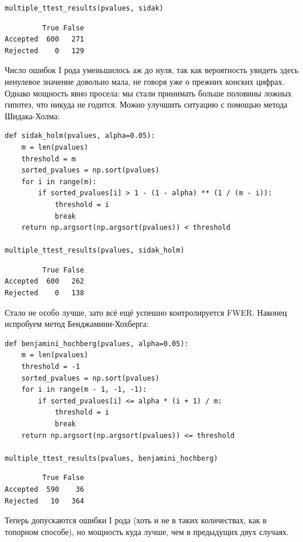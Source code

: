 \begin{example}
\begin{verbatim}
multiple_ttest_results(pvalues, sidak)
    \end{verbatim}
    \begin{lstlisting}
         True False
Accepted  600   271
Rejected    0   129
    \end{lstlisting}
    Число ошибок I рода уменьшилось аж до нуля, так как вероятность увидеть здесь ненулевое значение довольно мала, не говоря уже о прежних конских цифрах. Однако мощность явно просела: мы стали принимать больше половины ложных гипотез, что никуда не годится. Можно улучшить ситуацию с помощью метода Шидака-Холма:
    \begin{verbatim}
def sidak_holm(pvalues, alpha=0.05):
    m = len(pvalues)
    threshold = m
    sorted_pvalues = np.sort(pvalues)
    for i in range(m):
        if sorted_pvalues[i] > 1 - (1 - alpha) ** (1 / (m - i)):
            threshold = i
            break
    return np.argsort(np.argsort(pvalues)) < threshold

multiple_ttest_results(pvalues, sidak_holm)
    \end{verbatim}
    \begin{lstlisting}
         True False
Accepted  600   262
Rejected    0   138
    \end{lstlisting}
    Стало не особо лучше, зато всё ещё успешно контролируется FWER. Наконец испробуем метод Бенджамини-Хохберга:
    \begin{verbatim}
def benjamini_hochberg(pvalues, alpha=0.05):
    m = len(pvalues)
    threshold = -1
    sorted_pvalues = np.sort(pvalues)
    for i in range(m - 1, -1, -1):
        if sorted_pvalues[i] <= alpha * (i + 1) / m:
            threshold = i
            break
    return np.argsort(np.argsort(pvalues)) <= threshold

multiple_ttest_results(pvalues, benjamini_hochberg)
    \end{verbatim}
    \begin{lstlisting}
         True False
Accepted  590    36
Rejected   10   364
    \end{lstlisting}
    Теперь допускаются ошибки I рода (хоть и не в таких количествах, как в топорном способе), но мощность куда лучше, чем в предыдущих двух случаях.
\end{example}



